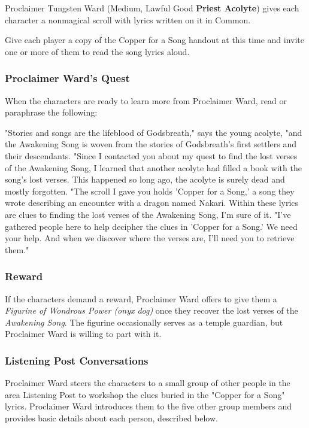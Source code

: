 \documentclass[letterpaper, 11pt, twocolumn]{dndbook}
\begin{document}
Proclaimer Tungsten Ward (Medium, Lawful Good \textbf{Priest Acolyte}) gives each character a nonmagical scroll with lyrics written on it in Common.

Give each player a copy of the Copper for a Song handout at this time and invite one or more of them to read the song lyrics aloud.


\subsubsection{Proclaimer Ward's Quest}

When the characters are ready to learn more from Proclaimer Ward, read or paraphrase the following:

\begin{DndReadAloud}
"Stories and songs are the lifeblood of Godsbreath," says the young acolyte, "and the Awakening Song is woven from the stories of Godsbreath's first settlers and their descendants. "Since I contacted you about my quest to find the lost verses of the Awakening Song, I learned that another acolyte had filled a book with the song's lost verses. This happened so long ago, the acolyte is surely dead and mostly forgotten. "The scroll I gave you holds 'Copper for a Song,' a song they wrote describing an encounter with a dragon named Nakari. Within these lyrics are clues to finding the lost verses of the Awakening Song, I'm sure of it. "I've gathered people here to help decipher the clues in 'Copper for a Song.' We need your help. And when we discover where the verses are, I'll need you to retrieve them."
\end{DndReadAloud}

\subsubsection{Reward}

If the characters demand a reward, Proclaimer Ward offers to give them a \textit{Figurine of Wondrous Power (onyx dog)} once they recover the lost verses of the \textit{Awakening Song}. The figurine occasionally serves as a temple guardian, but Proclaimer Ward is willing to part with it.

\subsubsection{Listening Post Conversations}

Proclaimer Ward steers the characters to a small group of other people in the area Listening Post to workshop the clues buried in the "Copper for a Song" lyrics. Proclaimer Ward introduces them to the five other group members and provides basic details about each person, described below.
\end{document}
